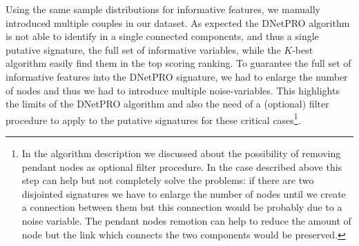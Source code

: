 \documentclass{standalone}
\begin{document}
Using the same sample distributions for informative features, we manually introduced multiple couples in our dataset.
As expected the \textsf{DNetPRO} algorithm is not able to identify in a single connected components, and thus a single putative signature, the full set of informative variables, while the $K$-best algorithm easily find them in the top scoring ranking.
To guarantee the full set of informative features into the \textsf{DNetPRO} signature, we had to enlarge the number of nodes and thus we had to introduce multiple noise-variables.
This highlights the limits of the \textsf{DNetPRO} algorithm and also the need of a (optional) filter procedure to apply to the putative signatures for these critical cases\footnote{
  In the algorithm description we discussed about the possibility of removing pendant nodes as optional filter procedure.
  In the case described above this step can help but not completely solve the problems: if there are two disjointed signatures we have to enlarge the number of nodes until we create a connection between them but this connection would be probably due to a noise variable.
  The pendant nodes remotion can help to reduce the amount of node but the link which connects the two components would be preserved.
}.

\end{document}
